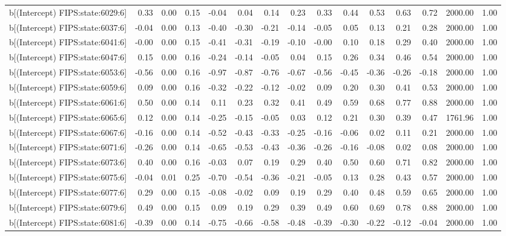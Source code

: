 \begin{table}[ht]
\begin{tabular}{rrrrrrrrrrrrrrr}
  b[(Intercept) FIPS:state:6029:6] & 0.33 & 0.00 & 0.15 & -0.04 & 0.04 & 0.14 & 0.23 & 0.33 & 0.44 & 0.53 & 0.63 & 0.72 & 2000.00 & 1.00 \\ 
  b[(Intercept) FIPS:state:6037:6] & -0.04 & 0.00 & 0.13 & -0.40 & -0.30 & -0.21 & -0.14 & -0.05 & 0.05 & 0.13 & 0.21 & 0.28 & 2000.00 & 1.00 \\ 
  b[(Intercept) FIPS:state:6041:6] & -0.00 & 0.00 & 0.15 & -0.41 & -0.31 & -0.19 & -0.10 & -0.00 & 0.10 & 0.18 & 0.29 & 0.40 & 2000.00 & 1.00 \\ 
  b[(Intercept) FIPS:state:6047:6] & 0.15 & 0.00 & 0.16 & -0.24 & -0.14 & -0.05 & 0.04 & 0.15 & 0.26 & 0.34 & 0.46 & 0.54 & 2000.00 & 1.00 \\ 
  b[(Intercept) FIPS:state:6053:6] & -0.56 & 0.00 & 0.16 & -0.97 & -0.87 & -0.76 & -0.67 & -0.56 & -0.45 & -0.36 & -0.26 & -0.18 & 2000.00 & 1.00 \\ 
  b[(Intercept) FIPS:state:6059:6] & 0.09 & 0.00 & 0.16 & -0.32 & -0.22 & -0.12 & -0.02 & 0.09 & 0.20 & 0.30 & 0.41 & 0.53 & 2000.00 & 1.00 \\ 
  b[(Intercept) FIPS:state:6061:6] & 0.50 & 0.00 & 0.14 & 0.11 & 0.23 & 0.32 & 0.41 & 0.49 & 0.59 & 0.68 & 0.77 & 0.88 & 2000.00 & 1.00 \\ 
  b[(Intercept) FIPS:state:6065:6] & 0.12 & 0.00 & 0.14 & -0.25 & -0.15 & -0.05 & 0.03 & 0.12 & 0.21 & 0.30 & 0.39 & 0.47 & 1761.96 & 1.00 \\ 
  b[(Intercept) FIPS:state:6067:6] & -0.16 & 0.00 & 0.14 & -0.52 & -0.43 & -0.33 & -0.25 & -0.16 & -0.06 & 0.02 & 0.11 & 0.21 & 2000.00 & 1.00 \\ 
  b[(Intercept) FIPS:state:6071:6] & -0.26 & 0.00 & 0.14 & -0.65 & -0.53 & -0.43 & -0.36 & -0.26 & -0.16 & -0.08 & 0.02 & 0.08 & 2000.00 & 1.00 \\ 
  b[(Intercept) FIPS:state:6073:6] & 0.40 & 0.00 & 0.16 & -0.03 & 0.07 & 0.19 & 0.29 & 0.40 & 0.50 & 0.60 & 0.71 & 0.82 & 2000.00 & 1.00 \\ 
  b[(Intercept) FIPS:state:6075:6] & -0.04 & 0.01 & 0.25 & -0.70 & -0.54 & -0.36 & -0.21 & -0.05 & 0.13 & 0.28 & 0.43 & 0.57 & 2000.00 & 1.00 \\ 
  b[(Intercept) FIPS:state:6077:6] & 0.29 & 0.00 & 0.15 & -0.08 & -0.02 & 0.09 & 0.19 & 0.29 & 0.40 & 0.48 & 0.59 & 0.65 & 2000.00 & 1.00 \\ 
  b[(Intercept) FIPS:state:6079:6] & 0.49 & 0.00 & 0.15 & 0.09 & 0.19 & 0.29 & 0.39 & 0.49 & 0.60 & 0.69 & 0.78 & 0.88 & 2000.00 & 1.00 \\ 
  b[(Intercept) FIPS:state:6081:6] & -0.39 & 0.00 & 0.14 & -0.75 & -0.66 & -0.58 & -0.48 & -0.39 & -0.30 & -0.22 & -0.12 & -0.04 & 2000.00 & 1.00 \\ 

\end{tabular}
\end{table}
